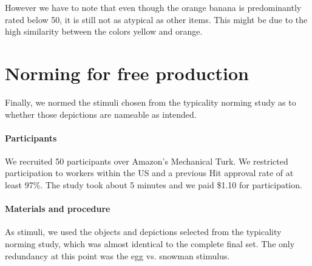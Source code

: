 \documentclass[a4paper,man,floatsintext,natbib,donotrepeattitle]{apa6}
\newcommand{\ek}[1]{\textcolor{Orange}{[ek: #1]}}
\begin{document}
However we have to note that even though the orange banana is predominantly rated below 50, it is still not as atypical as other items. This might be due to the high similarity between the colors yellow and orange.

\section{Norming for free production}
\label{freeprodnorming}








Finally, we normed the stimuli chosen from the typicality norming study as to whether those depictions are nameable as intended.

\paragraph{Participants}
We recruited 50 participants over Amazon's Mechanical Turk. We restricted participation to workers within the US and a previous Hit approval rate of at least 97\%. The study took about 5 minutes and we paid \$1.10 for participation. 

\paragraph{Materials and procedure}
As stimuli, we used the objects and depictions selected from the typicality norming study, which was almost identical to the complete final set. The only redundancy at this point was the egg vs. snowman stimulus. 
\end{document}
